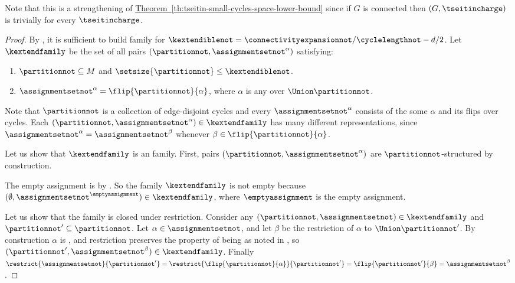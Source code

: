 \documentclass[11pt]{article}
\numberwithin{equation}{section}
\theoremstyle{definition}
\theoremstyle{plain}
\newcommand{\expref}[2]{\hyperref[#2]{#1~\ref{#2}}}
\begin{document}
Note that this is a strengthening of \expref{Theorem}{th:tseitin-small-cycles-space-lower-bound} since if $G$ is connected then $(G,\tseitincharge)$ is trivially \Gnonsplitting for every $\tseitincharge$.

\begin{proof}
  By , it is sufficient to build \akextendible family for $\kextendiblenot = \connectivityexpansionnot / \cyclelengthnot - d/2$. Let $\kextendfamily$ be the set of all pairs $(\partitionnot,\assignmentsetnot^\alpha)$ satisfying:
  \begin{enumerate}
  \item $\partitionnot\subseteq M$ and $\setsize{\partitionnot}\leq \kextendiblenot$.
  \item $\assignmentsetnot^{\alpha}=\flip{\partitionnot}{\alpha}$, where $\alpha$ is any \nonsplittingassignment over $\Union \partitionnot$.
  \end{enumerate}
  Note that $\partitionnot$ is a collection of edge-disjoint cycles and every $\assignmentsetnot^\alpha$ consists of the some \nonsplittingassignment $\alpha$ and its flips over cycles. Each $(\partitionnot,\assignmentsetnot^{\alpha}) \in \kextendfamily$ has many different representations, since $\assignmentsetnot^{\alpha}=\assignmentsetnot^{\beta}$ whenever $\beta\in\flip{\partitionnot}{\alpha}$.

  Let us show that $\kextendfamily$ is an \kextendibleNok family. First, pairs $(\partitionnot,\assignmentsetnot^{\alpha})$ are $\partitionnot$-structured by construction.
  
  The empty assignment is \nonsplitting by . So the family $\kextendfamily$ is not empty because $(\emptyset,\assignmentsetnot^{\emptyassignment})\in\kextendfamily$, where $\emptyassignment$ is the empty assignment.

  Let us show that the family is closed under restriction. Consider any $(\partitionnot,\assignmentsetnot)\in\kextendfamily$ and $\partitionnot'\subseteq \partitionnot$. Let $\alpha\in\assignmentsetnot$, and let $\beta$ be the restriction of $\alpha$ to $\Union\partitionnot'$. By construction $\alpha$ is \nonsplitting, and restriction preserves the property of being \nonsplitting as noted in , so $(\partitionnot',\assignmentsetnot^{\beta})\in\kextendfamily$. Finally $\restrict{\assignmentsetnot}{\partitionnot'}=\restrict{\flip{\partitionnot}{\alpha}}{\partitionnot'}=\flip{\partitionnot'}{\beta}=\assignmentsetnot^{\beta}$.


\end{proof}
\end{document}
